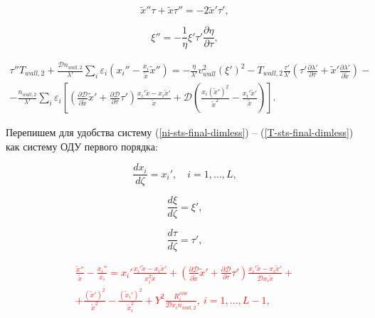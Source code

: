 \documentclass[12pt]{article}
\begin{document}
\begin{equation}
  \tilde{x}''\tau + \tilde{x}\tau'' = -2\tilde{x}'\tau',
\end{equation}

\begin{equation}
  \xi'' = -\frac{1}{\eta} \xi' \tau' \frac{\partial \eta}{\partial \tau},
\end{equation}

\begin{multline}
  \tau''T_{wall,2} + \frac{\mathcal{D}n_{wall,2}}{\lambda'}\sum_{i}\varepsilon_{i}\left(x_{i}'' - \frac{x_{i}}{\tilde{x}}\tilde{x}'' \right) = -\frac{\eta}{\lambda'} v_{wall}^2 \left(\xi' \right)^2 - T_{wall,2}\frac{\tau'}{\lambda'} \left(\tau' \frac{\partial \lambda'}{\partial \tau} + \tilde{x}' \frac{\partial \lambda'}{\partial \tilde{x}} \right) - \\
  - \frac{n_{wall,2}}{\lambda'}\sum_{i}\varepsilon_{i} \left[\left(\frac{\partial \mathcal{D}}{\partial \tilde{x}}\tilde{x}' + \frac{\partial \mathcal{D}}{\partial \tau}\tau' \right) \frac{x_{i}'\tilde{x} - x_{i}\tilde{x}'}{\tilde{x}} + \mathcal{D}\left(\frac{x_{i}\left(\tilde{x}'\right)^2}{\tilde{x}^2} - \frac{x_{i}'\tilde{x}'}{\tilde{x}} \right)  \right].\label{T-sts-final-dimless}
\end{multline}

Перепишем для удобства систему (\ref{ni-sts-final-dimless}) -- (\ref{T-sts-final-dimless}) как систему ОДУ первого порядка:

\begin{equation}
  \frac{d x_{i}}{d\zeta} = x_{i}',\quad i=1,\ldots,L,
\end{equation}

\begin{equation}
  \frac{d \xi}{d\zeta} = \xi', 
\end{equation}

\begin{equation}
  \frac{d \tau}{d\zeta} = \tau', 
\end{equation}

\textcolor{red}{
\begin{multline}
\frac{\tilde{x}''}{\tilde{x}} - \frac{x_{i}''}{x_{i}} = 
  x_{i}' \frac{x_{i}'\tilde{x} - x_{i}\tilde{x}'}{x_{i}^2 \tilde{x}} + \left(\frac{\partial \mathcal{D}}{\partial \tilde{x}}\tilde{x}' + \frac{\partial \mathcal{D}}{\partial \tau}\tau' \right) \frac{x_{i}'\tilde{x} - x_{i}\tilde{x}'}{\mathcal{D}x_{i}\tilde{x}} + \\
  + \frac{\left(\tilde{x}'\right)^2}{\tilde{x}^2} - \frac{\left(\tilde{x}_{i}'\right)^2}{\tilde{x}_{i}^2} + Y^{2}\frac{R_{i}^{vibr}}{\mathcal{D}x_{i}n_{wall,2}},\:i=1,\ldots,L-1,\label{ni-sts-final-dimless}
\end{multline}
}
\end{document}
